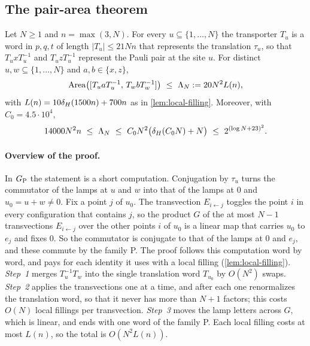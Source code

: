 \subsection{The pair-area theorem}\label{sec:pair-thm}

\begin{theorem}\label{thm:pair-area}
Let $N\ge1$ and $n=\max(3,N)$. For every $u\subseteq\{1,\dots,N\}$ the transporter $T_u$ is a word in $p,q,t$ of length $|T_u|\le21Nn$ that
represents the translation $\tau_u$, so that $T_uxT_u^{-1}$ and $T_uzT_u^{-1}$ represent the Pauli pair at the site $u$. For distinct
$u,w\subseteq\{1,\dots,N\}$ and $a,b\in\{x,z\}$,
\[
\Area\bigl([T_uaT_u^{-1},\,T_wbT_w^{-1}]\bigr)\ \le\ \Lambda_N:=20N^2L(n),
\]
with $L(n)=10\delta_{H}(1500n)+700n$ as in \cref{lem:local-filling}. Moreover, with $C_0=4.5\cdot10^4$,
\[
14000N^2n\ \le\ \Lambda_N\ \le\ C_0N^2\bigl(\dH(C_0N)+N\bigr)\ \le\ 2^{(\log N+23)^2}.
\]
\end{theorem}

\paragraph{Overview of the proof.} In $G_{\mathrm P}$ the statement is a short computation. Conjugation by $\tau_u$ turns the commutator of the
lamps at $u$ and $w$ into that of the lamps at $0$ and $u_0=u+w\ne0$. Fix a point $j$ of $u_0$. The transvection $E_{i\leftarrow j}$
toggles the point $i$ in every configuration that contains $j$, so the product $G$ of the at most $N-1$ transvections $E_{i\leftarrow j}$ over
the other points $i$ of $u_0$ is a linear map that carries $u_0$ to $e_j$ and fixes $0$. So the commutator is conjugate to that of the lamps
at $0$ and $e_j$, and these commute by the family \textsf{P}. The proof follows this computation word by word, and pays for each identity
it uses with a local filling (\cref{lem:local-filling}). \emph{Step~1} merges $T_u^{-1}T_w$ into the single translation word $T_{u_0}$ by
$O(N^2)$ swaps. \emph{Step~2} applies the transvections one at a time, and after each one renormalizes the translation word, so that it
never has more than $N+1$ factors; this costs $O(N)$ local fillings per transvection. \emph{Step~3} moves the lamp letters across $G$,
which is linear, and ends with one word of the family \textsf{P}. Each local filling costs at most $L(n)$, so the total is $O(N^2L(n))$.


